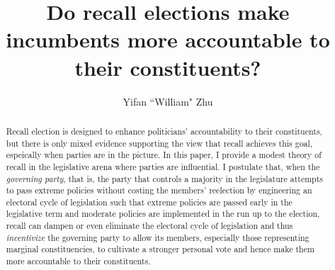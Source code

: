 \documentclass{article}
\title{Do recall elections make incumbents more accountable to their constituents?}
\author{Yifan ``William" Zhu}
\begin{document}
	\afterpage{\cfoot{\thepage}}
	
	
	 \pagestyle{fancy}
	 \fancyhead{}\fancyfoot{}
	 \setlength{\headheight}{0.1in}
	
	\afterpage{\cfoot{\thepage}}
	
	\maketitle
	\thispagestyle{fancy}
	\begin{abstract}
		Recall election is designed to enhance politicians' accountability to their constituents,
		but there is only mixed evidence supporting the view that recall achieves this goal,
		espeically when parties are in the picture.
		In this paper,
		I provide a modest theory of recall
		in the legislative arena where parties are influential.
		I postulate that,
		when the \textit{governing party},
		that is, the party that controls a majority
		in the legislature
		attempts to pass extreme policies without costing the members' reelection
		by engineering an electoral cycle of legislation
		such that extreme policies are passed early in the legislative term
		and moderate policies are implemented in the run up to the election,
		recall
		can dampen or even eliminate the electoral cycle of legislation
		and thus \textit{incentivize} the governing party
		to allow its members,
		especially those representing marginal constituencies,
		to cultivate a stronger personal vote
		and hence make them more accountable to their constituents.
		
		
	\end{abstract}
	
\end{document}
